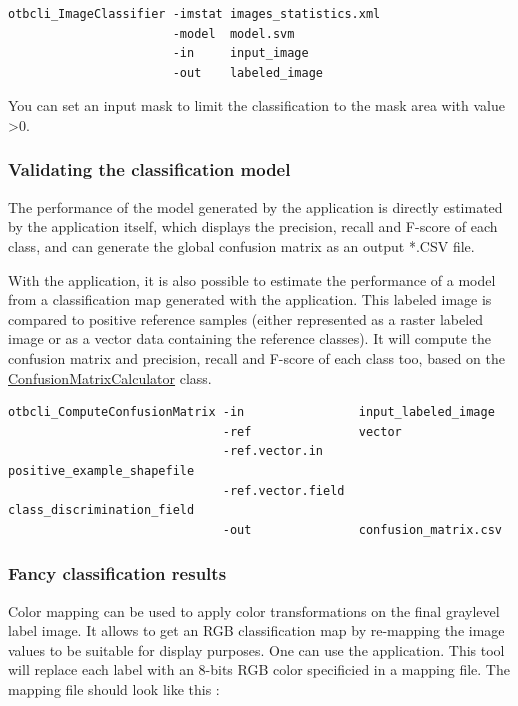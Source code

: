 \begin{verbatim}
otbcli_ImageClassifier -imstat images_statistics.xml
                       -model  model.svm
                       -in     input_image
                       -out    labeled_image
\end{verbatim}

You can set an input mask to limit the classification to the mask area with
value \textgreater 0.


\subsubsection{Validating the classification model}
The performance of the model generated by the  
application is directly estimated by the application itself, which displays the 
precision, recall and F-score of each class, and can generate the global confusion 
matrix as an output *.CSV file.
 
With the  application, it is also possible to 
estimate the performance of a model from a classification map generated with the 
 application. 
This labeled image is compared to positive reference samples (either represented as 
a raster labeled image or as a vector data containing the reference classes). It 
will compute the confusion matrix and precision, recall and F-score of each class 
too, based on the 
\href{http://www.orfeo-toolbox.org/doxygen-current/classotb_1_1ConfusionMatrixCalculator.html}{ConfusionMatrixCalculator} 
class.

\begin{verbatim}
otbcli_ComputeConfusionMatrix -in                input_labeled_image
                              -ref               vector
                              -ref.vector.in     positive_example_shapefile
                              -ref.vector.field  class_discrimination_field
                              -out               confusion_matrix.csv
\end{verbatim}



\subsubsection{Fancy classification results}
\label{ssec:classificationcolormapping}
Color mapping can be used to apply color transformations on the final
graylevel label image. It allows to get an RGB classification map
by re-mapping the image values to be suitable for display purposes.
One can use the  application. This tool will
replace each label with an 8-bits RGB color specificied in a mapping
file. The mapping file should look like this :


